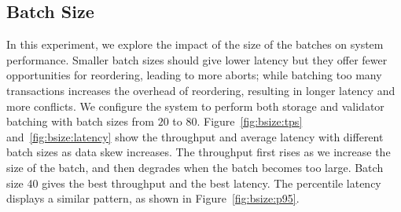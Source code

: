 \subsection{Batch Size}
In this experiment, we explore the impact of the size of the batches on system performance. 
Smaller batch sizes should give lower latency but they offer fewer opportunities for reordering, leading to more aborts; while batching too many transactions increases the overhead of reordering, resulting in longer latency and more conflicts.
We configure the system to perform both storage and validator batching with batch sizes from $20$ to $80$.
Figure~\ref{fig:bsize:tps} and~\ref{fig:bsize:latency} show the throughput and average latency with different batch sizes as data skew increases. The throughput first rises as we increase the size of the batch, and then degrades when the batch becomes too large. Batch size 40 gives the best throughput and the best latency. The percentile latency displays a similar pattern, as shown in Figure~\ref{fig:bsize:p95}.

